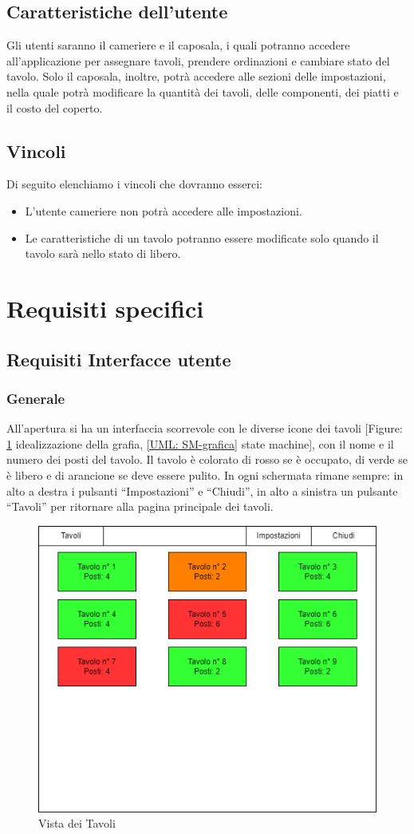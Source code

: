 \documentclass[12pt, letterpaper]{book}
\begin{document}
\subsection{Caratteristiche dell'utente}
Gli utenti saranno il cameriere e il caposala, i quali potranno accedere all'applicazione per assegnare tavoli, prendere ordinazioni e cambiare stato del tavolo. Solo il caposala, inoltre, potrà accedere alle sezioni delle impostazioni, nella quale potrà modificare la quantità dei tavoli, delle componenti, dei piatti e il costo del coperto.

\subsection{Vincoli}
Di seguito elenchiamo i vincoli che dovranno esserci:
\begin{itemize}
    \item L'utente cameriere non potrà accedere alle impostazioni.
    \item Le caratteristiche di un tavolo potranno essere modificate solo quando il tavolo sarà nello stato di libero.
\end{itemize}



\section{Requisiti specifici}
\subsection{Requisiti Interfacce utente}
\subsubsection{Generale}
All'apertura si ha un interfaccia scorrevole con le diverse icone dei tavoli [Figure: \ref{vistaTavoli} idealizzazione della grafia, \ref{UML: SM-grafica} state machine], con il nome e il numero dei posti del tavolo. Il tavolo è colorato di rosso se è occupato, di verde se è libero e di arancione se deve essere pulito.
In ogni schermata rimane sempre: in alto a destra i pulsanti “Impostazioni” e “Chiudi”, in alto a sinistra un pulsante “Tavoli” per ritornare alla pagina principale dei tavoli.

\begin{figure}[H]
    \centering
    \includegraphics[width = 0.5 \linewidth]{../Documentazione/Drawio/VistaTavoli.png}
    \caption{Vista dei Tavoli}
    \label{vistaTavoli}
\end{figure}
\end{document}
